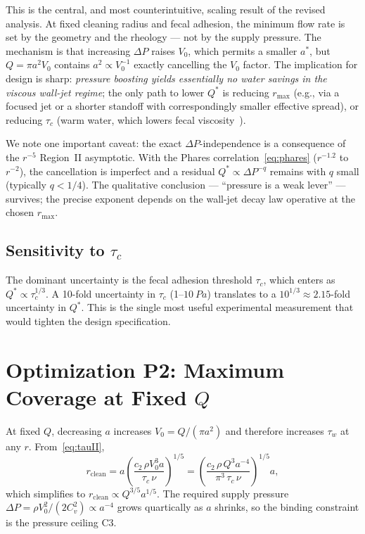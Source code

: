 \documentclass[10pt,letterpaper]{article}
\begin{document}
This is the central, and most counterintuitive, scaling result of the
revised analysis. At fixed cleaning radius and fecal adhesion, the minimum
flow rate is set by the geometry and the rheology --- not by the supply
pressure. The mechanism is that increasing $\Delta P$ raises $V_0$, which
permits a smaller $a^*$, but $Q = \pi a^2 V_0$ contains $a^2 \propto V_0^{-1}$
exactly cancelling the $V_0$ factor. The implication for design is sharp:
\emph{pressure boosting yields essentially no water savings in the
viscous wall-jet regime}; the only path to lower $Q^*$ is reducing
$r_\mathrm{max}$ (e.g., via a focused jet or a shorter standoff with
correspondingly smaller effective spread), or reducing $\tau_c$ (warm
water, which lowers fecal viscosity~\citep{Woolley2014}).

We note one important caveat: the exact $\Delta P$-independence is a
consequence of the $r^{-5}$ Region~II asymptotic. With the Phares
correlation~\eqref{eq:phares} ($r^{-1.2}$ to $r^{-2}$), the cancellation
is imperfect and a residual $Q^* \propto \Delta P^{-q}$ remains with
$q$ small (typically $q < 1/4$). The qualitative conclusion ---
``pressure is a weak lever'' --- survives; the precise exponent depends
on the wall-jet decay law operative at the chosen $r_\mathrm{max}$.

\subsection{Sensitivity to $\tau_c$}

The dominant uncertainty is the fecal adhesion threshold $\tau_c$, which
enters as $Q^* \propto \tau_c^{1/3}$. A 10-fold uncertainty in $\tau_c$
(1--$10~Pa$) translates to a $10^{1/3} \approx 2.15$-fold uncertainty
in $Q^*$. This is the single most useful experimental measurement that
would tighten the design specification.

\section{Optimization P2: Maximum Coverage at Fixed $Q$}
\label{sec:P2}

At fixed $Q$, decreasing $a$ increases $V_0 = Q/(\pi a^2)$ and therefore
increases $\tau_w$ at any $r$. From~\eqref{eq:tauII},
\begin{equation}
  r_\mathrm{clean} = a\left(\frac{c_2\,\rho V_0^3 a}{\tau_c\,\nu}\right)^{1/5}
  = \left(\frac{c_2\,\rho\,Q^3 a^{-4}}{\pi^3\,\tau_c\,\nu}\right)^{1/5} a,
  \label{eq:rcleanQ}
\end{equation}
which simplifies to $r_\mathrm{clean} \propto Q^{3/5} a^{1/5}$. The
required supply pressure $\Delta P = \rho V_0^2/(2 C_v^2) \propto a^{-4}$
grows quartically as $a$ shrinks, so the binding constraint is the
pressure ceiling C3.
\end{document}
